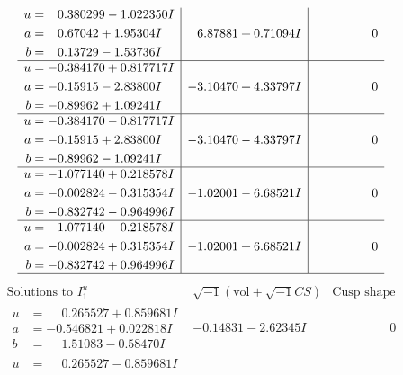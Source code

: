 \documentclass[1p]{elsarticle_modified}
\theoremstyle{definition}
\newcommand{\I}{\sqrt{-1}}
\begin{document}
$$\begin{array}{c|c|c}
\begin{aligned}
u &= \phantom{-}0.380299 - 1.022350 I \\
a &= \phantom{-}0.67042 + 1.95304 I \\
b &= \phantom{-}0.13729 - 1.53736 I\end{aligned}
 & \phantom{-}6.87881 + 0.71094 I & \phantom{-0.000000 } 0 \\ \hline\begin{aligned}
u &= -0.384170 + 0.817717 I \\
a &= -0.15915 - 2.83800 I \\
b &= -0.89962 + 1.09241 I\end{aligned}
 & -3.10470 + 4.33797 I & \phantom{-0.000000 } 0 \\ \hline\begin{aligned}
u &= -0.384170 - 0.817717 I \\
a &= -0.15915 + 2.83800 I \\
b &= -0.89962 - 1.09241 I\end{aligned}
 & -3.10470 - 4.33797 I & \phantom{-0.000000 } 0 \\ \hline\begin{aligned}
u &= -1.077140 + 0.218578 I \\
a &= -0.002824 - 0.315354 I \\
b &= -0.832742 - 0.964996 I\end{aligned}
 & -1.02001 - 6.68521 I & \phantom{-0.000000 } 0 \\ \hline\begin{aligned}
u &= -1.077140 - 0.218578 I \\
a &= -0.002824 + 0.315354 I \\
b &= -0.832742 + 0.964996 I\end{aligned}
 & -1.02001 + 6.68521 I & \phantom{-0.000000 } 0\\
 \hline 
 \end{array}$$\newpage$$\begin{array}{c|c|c}  
\text{Solutions to }I^u_{1}& \I (\text{vol} + \sqrt{-1}CS) & \text{Cusp shape}\\
 \hline 
\begin{aligned}
u &= \phantom{-}0.265527 + 0.859681 I \\
a &= -0.546821 + 0.022818 I \\
b &= \phantom{-}1.51083 - 0.58470 I\end{aligned}
 & -0.14831 - 2.62345 I & \phantom{-0.000000 } 0 \\ \hline\begin{aligned}
u &= \phantom{-}0.265527 - 0.859681 I \\

\end{aligned}
\end{array}$$
\end{document}
